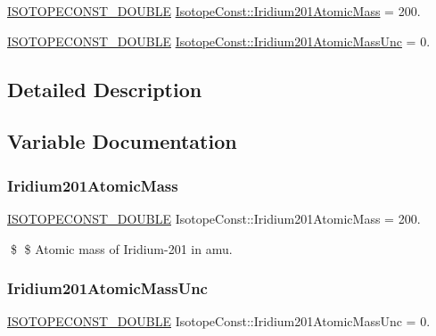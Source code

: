 \begin{DoxyCompactItemize}
\item 
\mbox{\hyperlink{group___isotope_const-_macros_ga8f45a7272ce02c0b4c65c44636ed719a}{I\+S\+O\+T\+O\+P\+E\+C\+O\+N\+S\+T\+\_\+\+D\+O\+U\+B\+LE}} \mbox{\hyperlink{group___isotope_const-_iridium-_ir201_gae2bb732a6f9aff07c92dc9ae07ba27f6}{Isotope\+Const\+::\+Iridium201\+Atomic\+Mass}} = 200.
\item 
\mbox{\hyperlink{group___isotope_const-_macros_ga8f45a7272ce02c0b4c65c44636ed719a}{I\+S\+O\+T\+O\+P\+E\+C\+O\+N\+S\+T\+\_\+\+D\+O\+U\+B\+LE}} \mbox{\hyperlink{group___isotope_const-_iridium-_ir201_gaa52d1ffe6bfd2b3a494727084a16f6ae}{Isotope\+Const\+::\+Iridium201\+Atomic\+Mass\+Unc}} = 0.
\end{DoxyCompactItemize}


\subsection{Detailed Description}


\subsection{Variable Documentation}
\mbox{\label{group___isotope_const-_iridium-_ir201_gae2bb732a6f9aff07c92dc9ae07ba27f6}} 
\subsubsection{\texorpdfstring{Iridium201\+Atomic\+Mass}{Iridium201AtomicMass}}
{\footnotesize\ttfamily \mbox{\hyperlink{group___isotope_const-_macros_ga8f45a7272ce02c0b4c65c44636ed719a}{I\+S\+O\+T\+O\+P\+E\+C\+O\+N\+S\+T\+\_\+\+D\+O\+U\+B\+LE}} Isotope\+Const\+::\+Iridium201\+Atomic\+Mass = 200.}

\$ \$ Atomic mass of Iridium-\/201 in amu. \mbox{\label{group___isotope_const-_iridium-_ir201_gaa52d1ffe6bfd2b3a494727084a16f6ae}} 
\subsubsection{\texorpdfstring{Iridium201\+Atomic\+Mass\+Unc}{Iridium201AtomicMassUnc}}
{\footnotesize\ttfamily \mbox{\hyperlink{group___isotope_const-_macros_ga8f45a7272ce02c0b4c65c44636ed719a}{I\+S\+O\+T\+O\+P\+E\+C\+O\+N\+S\+T\+\_\+\+D\+O\+U\+B\+LE}} Isotope\+Const\+::\+Iridium201\+Atomic\+Mass\+Unc = 0.}

